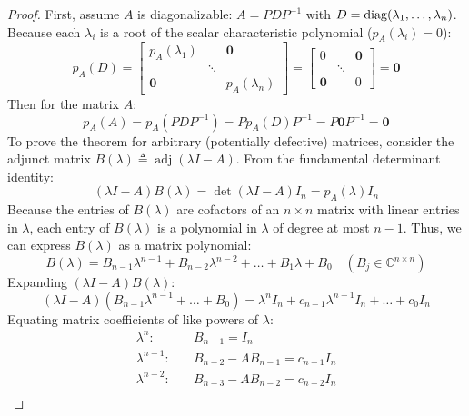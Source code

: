 \begin{proof}
First, assume $A$ is diagonalizable: $A = P D P^{-1}$ with $D = \operatorname{diag}(\lambda_1, \dots, \lambda_n)$.
Because each $\lambda_i$ is a root of the scalar characteristic polynomial ($p_A(\lambda_i) = 0$):
\begin{equation}
p_A(D) = \begin{bmatrix} p_A(\lambda_1) & & \mathbf{0} \\ & \ddots & \\ \mathbf{0} & & p_A(\lambda_n) \end{bmatrix} = \begin{bmatrix} 0 & & \mathbf{0} \\ & \ddots & \\ \mathbf{0} & & 0 \end{bmatrix} = \mathbf{0}
\end{equation}
Then for the matrix $A$:
\begin{equation}
p_A(A) = p_A(P D P^{-1}) = P p_A(D) P^{-1} = P \mathbf{0} P^{-1} = \mathbf{0}
\end{equation}
To prove the theorem for arbitrary (potentially defective) matrices, consider the adjunct matrix $B(\lambda) \triangleq \operatorname{adj}(\lambda I - A)$. From the fundamental determinant identity:
\begin{equation}
(\lambda I - A) B(\lambda) = \det(\lambda I - A) I_n = p_A(\lambda) I_n
\end{equation}
Because the entries of $B(\lambda)$ are cofactors of an $n \times n$ matrix with linear entries in $\lambda$, each entry of $B(\lambda)$ is a polynomial in $\lambda$ of degree at most $n - 1$. Thus, we can express $B(\lambda)$ as a matrix polynomial:
\begin{equation}
B(\lambda) = B_{n-1} \lambda^{n-1} + B_{n-2} \lambda^{n-2} + \dots + B_1 \lambda + B_0 \quad (B_j \in \mathbb{C}^{n \times n})
\end{equation}
Expanding $(\lambda I - A) B(\lambda)$:
\begin{equation}
(\lambda I - A)(B_{n-1} \lambda^{n-1} + \dots + B_0) = \lambda^n I_n + c_{n-1}\lambda^{n-1} I_n + \dots + c_0 I_n
\end{equation}
Equating matrix coefficients of like powers of $\lambda$:
\begin{align*}
\lambda^n: \quad & B_{n-1} = I_n \\
\lambda^{n-1}: \quad & B_{n-2} - A B_{n-1} = c_{n-1} I_n \\
\lambda^{n-2}: \quad & B_{n-3} - A B_{n-2} = c_{n-2} I_n \\

\end{align*}
\end{proof}
